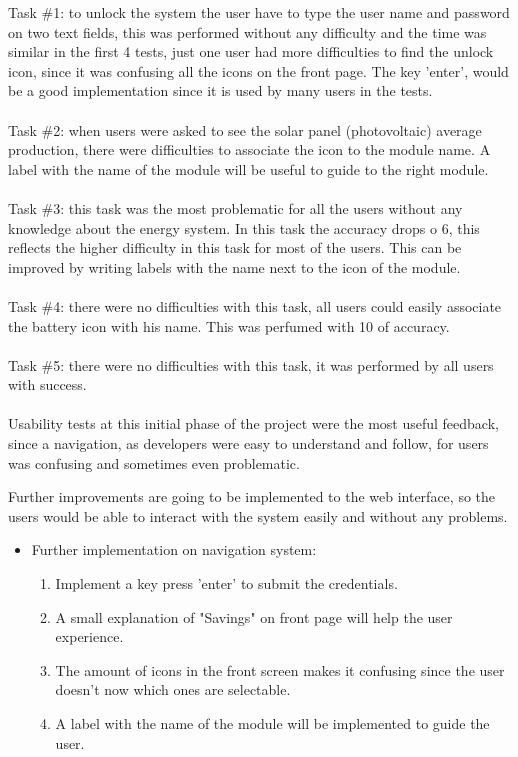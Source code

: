 Task \#1: to unlock the system the user have to type the user name and password on two text fields, this was performed without any difficulty and the time was similar in the first 4 tests, just one user had more difficulties to find  the unlock icon, since it was confusing all the icons on the front page. The key 'enter', would be a good implementation since it is used by many users in the tests.\\
\\
Task \#2: when users were asked to see the solar panel (photovoltaic) average production, there were difficulties to associate the icon to the module name. A label with the name of the module will be useful to guide to the right module.\\
\\
Task \#3: this task was the most problematic for all the users without any knowledge about the energy system. In this task the accuracy drops o 6, this reflects the higher difficulty in this task for most of the users. This can be improved by writing labels with the name next to the icon of the module.\\
\\
Task \#4: there were no difficulties with this task, all users could easily associate the battery icon with his name. This was perfumed with 10 of accuracy.\\
\\
Task \#5: there were no difficulties with this task, it was performed by all users with success.\\
\\
Usability tests at this initial phase of the project were the most useful feedback, since a navigation, as developers were easy to understand and follow, for users was confusing and sometimes even problematic.

Further improvements are going to be implemented to the web interface, so the users would be able to interact with the system easily and without any problems. \\
\begin{itemize}
	\item Further implementation on navigation system:
		\begin{enumerate}
			\item Implement a key press 'enter' to submit the credentials.
			\item A small explanation of "Savings" on front page will help the user experience.
			\item The amount of icons in the front screen makes it confusing since the user doesn't now which ones are selectable.
			\item  A label with the name of the module will be implemented to guide the user.
		\end{enumerate}
\end{itemize}

